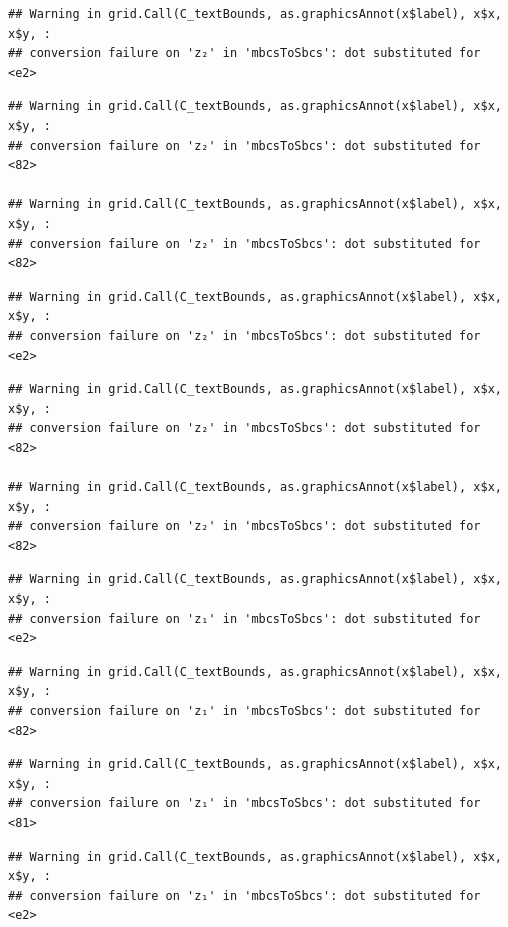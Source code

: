 \documentclass[]{article}
\begin{document}
\begin{verbatim}
## Warning in grid.Call(C_textBounds, as.graphicsAnnot(x$label), x$x, x$y, :
## conversion failure on 'z₂' in 'mbcsToSbcs': dot substituted for <e2>
\end{verbatim}

\begin{verbatim}
## Warning in grid.Call(C_textBounds, as.graphicsAnnot(x$label), x$x, x$y, :
## conversion failure on 'z₂' in 'mbcsToSbcs': dot substituted for <82>

## Warning in grid.Call(C_textBounds, as.graphicsAnnot(x$label), x$x, x$y, :
## conversion failure on 'z₂' in 'mbcsToSbcs': dot substituted for <82>
\end{verbatim}

\begin{verbatim}
## Warning in grid.Call(C_textBounds, as.graphicsAnnot(x$label), x$x, x$y, :
## conversion failure on 'z₂' in 'mbcsToSbcs': dot substituted for <e2>
\end{verbatim}

\begin{verbatim}
## Warning in grid.Call(C_textBounds, as.graphicsAnnot(x$label), x$x, x$y, :
## conversion failure on 'z₂' in 'mbcsToSbcs': dot substituted for <82>

## Warning in grid.Call(C_textBounds, as.graphicsAnnot(x$label), x$x, x$y, :
## conversion failure on 'z₂' in 'mbcsToSbcs': dot substituted for <82>
\end{verbatim}

\begin{verbatim}
## Warning in grid.Call(C_textBounds, as.graphicsAnnot(x$label), x$x, x$y, :
## conversion failure on 'z₁' in 'mbcsToSbcs': dot substituted for <e2>
\end{verbatim}

\begin{verbatim}
## Warning in grid.Call(C_textBounds, as.graphicsAnnot(x$label), x$x, x$y, :
## conversion failure on 'z₁' in 'mbcsToSbcs': dot substituted for <82>
\end{verbatim}

\begin{verbatim}
## Warning in grid.Call(C_textBounds, as.graphicsAnnot(x$label), x$x, x$y, :
## conversion failure on 'z₁' in 'mbcsToSbcs': dot substituted for <81>
\end{verbatim}

\begin{verbatim}
## Warning in grid.Call(C_textBounds, as.graphicsAnnot(x$label), x$x, x$y, :
## conversion failure on 'z₁' in 'mbcsToSbcs': dot substituted for <e2>
\end{verbatim}
\end{document}
